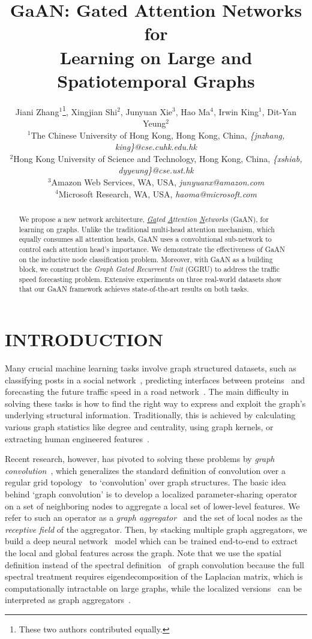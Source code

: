 \documentclass{article}
\title{GaAN: Gated Attention Networks for \\Learning on Large and Spatiotemporal Graphs}
\author{Jiani Zhang$^{1}$\thanks{\quad These two authors contributed equally.}, Xingjian Shi$^{2}$\footnotemark[1], Junyuan Xie$^{3}$, Hao Ma$^{4}$, Irwin King$^{1}$, Dit-Yan Yeung$^{2}$\\
	{\small $^1$The Chinese University of Hong Kong, Hong Kong, China,}
	\emph{\small \{jnzhang, king\}@cse.cuhk.edu.hk}\\
	{\small $^2$Hong Kong University of Science and Technology, Hong Kong, China,}
	\emph{\small \{xshiab, dyyeung\}@cse.ust.hk}\\
	{\small $^3$Amazon Web Services, WA, USA,}
	\emph{\small junyuanx@amazon.com}\\
	{\small $^4$Microsoft Research, WA, USA,}
	\emph{\small haoma@microsoft.com }
}
\begin{document}
	
	\maketitle
	
	\begin{abstract}
		We propose a new network architecture, \emph{\underline{Ga}ted \underline{A}ttention \underline{N}etworks} (GaAN), for learning on graphs. Unlike the traditional multi-head attention mechanism, which equally consumes all attention heads, GaAN uses a convolutional sub-network to control each attention head's importance. We demonstrate the effectiveness of GaAN on the inductive node classification problem. Moreover, with GaAN as a building block, we construct the \emph{Graph Gated Recurrent Unit} (GGRU) to address the traffic speed forecasting problem. Extensive experiments on three real-world datasets show that our GaAN framework achieves state-of-the-art results on both tasks.
	\end{abstract}
	
	\section{INTRODUCTION}
	
	Many crucial machine learning tasks involve graph structured datasets, such as classifying posts in a social network~\citep{hamilton2017inductive}, predicting interfaces between proteins~\citep{fout2017protein} and forecasting the future traffic speed in a road network~\citep{li2017graph}. The main difficulty in solving these tasks is how to find the right way to express and exploit the graph's underlying structural information. Traditionally, this is achieved by calculating various graph statistics like degree and centrality, using graph kernels, or extracting human engineered features~\citep{hamilton2017representation}.
	
	Recent research, however, has pivoted to solving these problems by \emph{graph convolution}~\citep{duvenaud2015convolutional,atwood2016diffusion,kipf2017semi,fout2017protein,hamilton2017inductive,velivckovic2017graph, li2017graph}, which generalizes the standard definition of convolution over a regular grid topology~\citep{gehring17a, krizhevsky2012imagenet}
to `convolution' over graph structures.  The basic idea behind `graph convolution' is to develop a localized parameter-sharing operator on a set of neighboring nodes to aggregate a local set of lower-level features. We refer to such an operator as a {\em graph aggregator}~\citep{hamilton2017inductive} and the set of local nodes as the {\em receptive field} of the aggregator. Then, by stacking multiple graph aggregators, we build a deep neural network~\citep{lecun2015deep} model which can be trained end-to-end to extract the local and global features across the graph.
	Note that we use the spatial definition instead of the spectral definition~\citep{hammond2011wavelets, bruna2014spectral} of graph convolution because the full spectral treatment requires eigendecomposition of the Laplacian matrix, which is computationally intractable on large graphs, while the localized versions~\citep{defferrard2016convolutional,kipf2017semi} can be interpreted as graph aggregators~\citep{hamilton2017inductive}.
	
\end{document}
